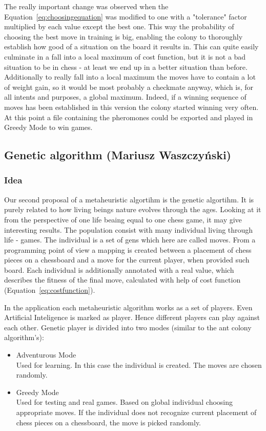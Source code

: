 \documentclass[pdftex]{article}
\begin{document}
The really important change was observed when the Equation~\ref{eq:choosingequation} was modified to one with a "tolerance" factor multiplied by each value except the best one. This way the probability of choosing the best move in training is big, enabling  the colony to thoroughly establish how good of a situation on the board it results in. This can quite easily culminate in a fall into a local maximum of cost function, but it is not a bad situation to be in chess - at least we end up in a better situation than before. Additionally to really fall into a local maximum the moves have to contain a lot of weight gain, so it would be most probably a checkmate anyway, which is, for all intents and purposes, a global maximum. Indeed, if a winning sequence of moves has been established in this version the colony started winning very often. At this point a file containing the pheromones could be exported and played in Greedy Mode to win games. 

\subsection{Genetic algorithm (Mariusz Waszczyński)}
\label{sec:genetic}

\subsubsection{Idea}
Our second proposal of a metaheuristic algortihm is the genetic algortihm. It is purely related to how living beings nature evolves through the ages. Looking at it from the perspective of one life beaing equal to one chess game, it may give interesting results. The population consist with many individual living through life - games. The individual is a set of gens which here are called moves. From a programming point of view a mapping is created between a placement of chess pieces on a chessboard and a move for the current player, when provided such board. Each individual is additionally annotated with a real value, which describes the fitness of the final move, calculated with help of cost function (Equation~\ref{eq:costfunction}).

In the application each metaheuristic algorithm works as a set of players. Even Artificial Inteligence is marked as player. Hence different players can play against each other. Genetic player is divided into two modes (similar to the ant colony algorithm's):
\begin{itemize}
 	\item Adventurous Mode \hfill \\
		Used for learning. In this case the individual is created. The moves are chosen randomly.

	\item Greedy Mode \hfill \\
		Used for testing and real games. Based on global individual choosing appropriate moves. If the individual does not recognize current placement of chess pieces on a chessboard, the move is picked randomly.
\end{itemize}
\end{document}
